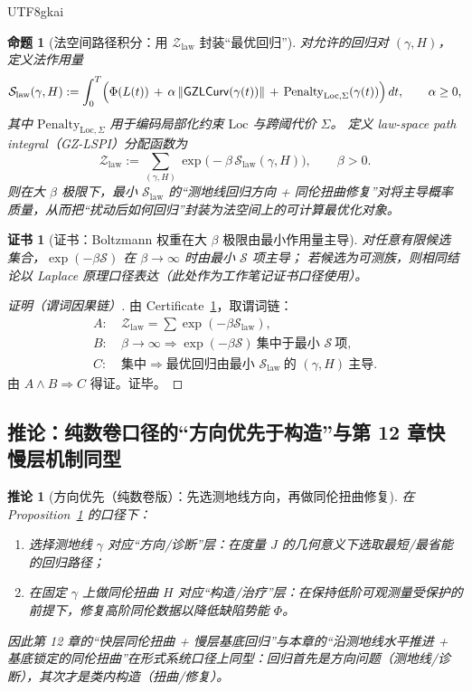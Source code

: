 \documentclass[12pt]{article}
\newtheorem{proposition}{命题}[section]
\newtheorem{corollary}{推论}[section]
\newtheorem{certificate}{证书}[section]
\newcommand{\GZLCurv}{\ensuremath{\mathsf{GZLCurv}}}
\begin{document}
\begin{CJK*}{UTF8}{gkai}
\begin{proposition}[法空间路径积分：用 $\mathcal{Z}_{\mathrm{law}}$ 封装“最优回归”]
\label{prop:lawspace-path-integral}
对允许的回归对 $(\gamma,H)$，定义法作用量
\[
\mathcal{S}_{\mathrm{law}}(\gamma,H)
:=
\int_0^T\Bigl(
\Phi(L(t))
\,+\,
\alpha\,\|\GZLCurv(\gamma(t))\|
\,+\,
\mathrm{Penalty}_{\mathrm{Loc},\Sigma}(\gamma(t))
\Bigr)\,dt,
\qquad \alpha\ge 0,
\]
其中 $\mathrm{Penalty}_{\mathrm{Loc},\Sigma}$ 用于编码局部化约束 $\mathrm{Loc}$ 与跨阈代价 $\Sigma$。
定义 law-space path integral（GZ-LSPI）分配函数为
\[
\mathcal{Z}_{\mathrm{law}}
:=
\sum_{(\gamma,H)}\exp\!\bigl(-\beta\,\mathcal{S}_{\mathrm{law}}(\gamma,H)\bigr),
\qquad \beta>0.
\]
则在大 $\beta$ 极限下，最小 $\mathcal{S}_{\mathrm{law}}$ 的“测地线回归方向 + 同伦扭曲修复”对将主导概率质量，从而把“扰动后如何回归”封装为法空间上的可计算最优化对象。
\end{proposition}

\begin{certificate}[证书：Boltzmann 权重在大 $\beta$ 极限由最小作用量主导]
\label{cert:lawspace-path-integral}
对任意有限候选集合，$\exp(-\beta\mathcal{S})$ 在 $\beta\to\infty$ 时由最小 $\mathcal{S}$ 项主导；
若候选为可测族，则相同结论以 Laplace 原理口径表达（此处作为工作笔记证书口径使用）。
\end{certificate}

\begin{proof}[证明（谓词因果链）]
由 Certificate~\ref{cert:lawspace-path-integral}，取谓词链：
\[
\begin{aligned}
A:&\ \mathcal{Z}_{\mathrm{law}}=\sum \exp(-\beta\mathcal{S}_{\mathrm{law}}),\\
B:&\ \beta\to\infty\Rightarrow \exp(-\beta\mathcal{S})\ \text{集中于最小 }\mathcal{S}\ \text{项},\\
C:&\ \text{集中}\Rightarrow \text{最优回归由最小 }\mathcal{S}_{\mathrm{law}}\ \text{的 }(\gamma,H)\ \text{主导}.
\end{aligned}
\]
由 $A\wedge B\Rightarrow C$ 得证。证毕。
\end{proof}

\subsection{推论：纯数卷口径的“方向优先于构造”与第 12 章快慢层机制同型}

\begin{corollary}[方向优先（纯数卷版）：先选测地线方向，再做同伦扭曲修复]
\label{cor:puremath-direction-before-construction}
在 Proposition~\ref{prop:lawspace-path-integral} 的口径下：
\begin{enumerate}
  \item 选择测地线 $\gamma$ 对应“方向/诊断”层：在度量 $J$ 的几何意义下选取最短/最省能的回归路径；
  \item 在固定 $\gamma$ 上做同伦扭曲 $H$ 对应“构造/治疗”层：在保持低阶可观测量受保护的前提下，修复高阶同伦数据以降低缺陷势能 $\Phi$。
\end{enumerate}
因此第 12 章的“快层同伦扭曲 + 慢层基底回归”与本章的“沿测地线水平推进 + 基底锁定的同伦扭曲”在形式系统口径上同型：回归首先是方向问题（测地线/诊断），其次才是类内构造（扭曲/修复）。
\end{corollary}


\end{CJK*}
\end{document}
